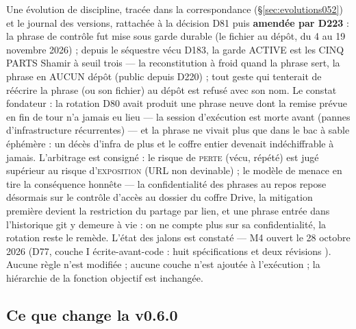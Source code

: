 Une évolution de discipline, tracée dans la correspondance (§\ref{sec:evolutions052}) et
le journal des versions, rattachée à la décision D81 puis \textbf{amendée par D223} :
la phrase de contrôle fut mise sous garde durable (le fichier au dépôt, du 4 au
19 novembre 2026) ; depuis le séquestre vécu D183, la garde ACTIVE est les CINQ
PARTS Shamir à seuil trois — la reconstitution à froid quand la phrase sert,
la phrase en AUCUN dépôt (public depuis D220) ; tout geste qui tenterait de
réécrire la phrase (ou son fichier) au dépôt est refusé avec son nom. Le constat fondateur : la
rotation D80 avait produit une phrase neuve dont la remise prévue en fin de tour n’a
jamais eu lieu — la session d’exécution est morte avant (pannes d’infrastructure
récurrentes) — et la phrase ne vivait plus que dans le bac à sable éphémère : un décès
d’infra de plus et le coffre entier devenait indéchiffrable à jamais. L’arbitrage est
consigné : le risque de \textsc{perte} (vécu, répété) est jugé supérieur au risque
d’\textsc{exposition} (URL non devinable) ; le modèle de menace en tire la conséquence
honnête — la confidentialité des phrases au repos repose désormais sur le contrôle
d’accès au dossier du coffre Drive, la mitigation première devient la restriction du
partage par lien, et une phrase entrée dans l’historique git y demeure à vie : on ne
compte plus sur sa confidentialité, la rotation reste le remède. L’état des jalons est
constaté — M4 ouvert le 28 octobre 2026 (D77, couche I écrite-avant-code : huit
spécifications  et deux révisions ). Aucune règle n’est modifiée ;
aucune couche n’est ajoutée à l’exécution ; la hiérarchie de la fonction objectif est
inchangée.

\subsection{Ce que change la v0.6.0}\label{sec:nouveautes060}

